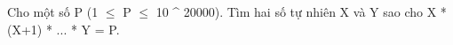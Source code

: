 Cho một số P (1  $\le$  P  $\le$  10 ^ 20000). Tìm hai số tự nhiên X và Y sao cho X * (X+1) * ... * Y = P.
